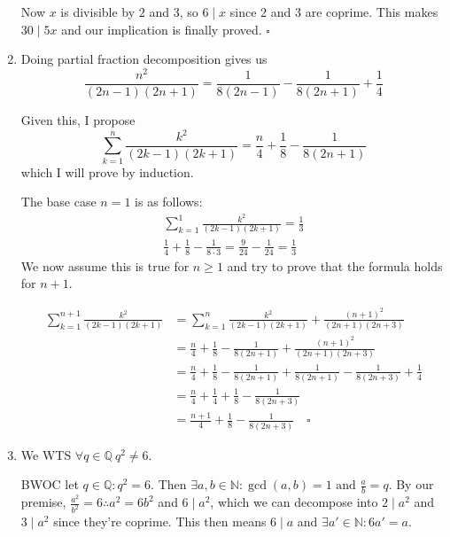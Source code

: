 \documentclass[12pt]{article}
\begin{document}
\begin{enumerate}
            Now $x$ is divisible by $2$ and $3$, so $6 \mid x$ since $2$ and $3$ are coprime.
            This makes $30 \mid 5x$ and our implication is finally proved. $\square$

      \item Doing partial fraction decomposition gives us
            \[\frac{n^2}{(2n-1)(2n+1)}=\frac{1}{8(2n-1)}-\frac{1}{8(2n+1)}+\frac{1}{4}\]

            Given this, I propose
            \[\sum_{k=1}^{n} \frac{k^2}{(2k-1)(2k+1)}=\frac{n}{4}+\frac{1}{8}-\frac{1}{8(2n+1)}\]
            which I will prove by induction.

            The base case $n=1$ is as follows:
            \begin{gather*}
                  \sum_{k=1}^{1} \frac{k^2}{(2k-1)(2k+1)}=\frac{1}{3} \\
                  \frac{1}{4}+\frac{1}{8}-\frac{1}{8 \cdot 3}=\frac{9}{24}-\frac{1}{24}=\frac{1}{3}
            \end{gather*}
            We now assume this is true for $n \ge 1$ and try to prove that the formula holds for $n+1$.

            \begin{align*}
                  \sum_{k=1}^{n+1} \frac{k^2}{(2k-1)(2k+1)}
                   & = \sum_{k=1}^{n} \frac{k^2}{(2k-1)(2k+1)} + \frac{(n+1)^2}{(2n+1)(2n+3)}                      \\
                   & = \frac{n}{4}+\frac{1}{8}-\frac{1}{8(2n+1)} + \frac{(n+1)^2}{(2n+1)(2n+3)}                    \\
                   & = \frac{n}{4}+\frac{1}{8}-\frac{1}{8(2n+1)} + \frac{1}{8(2n+1)}-\frac{1}{8(2n+3)}+\frac{1}{4} \\
                   & = \frac{n}{4}+\frac{1}{4}+\frac{1}{8}-\frac{1}{8(2n+3)}                                       \\
                   & = \frac{n+1}{4}+\frac{1}{8}-\frac{1}{8(2n+3)}\quad\square
            \end{align*}

      \item We WTS $\forall q \in \mathbb{Q}\ q^2 \ne 6$.

            BWOC let $q \in \mathbb{Q}: q^2=6$.
            Then $\exists a, b \in \mathbb{N}: \gcd(a,b)=1 \text{ and } \frac{a}{b}=q$.
            By our premise, $\frac{a^2}{b^2}=6 \therefore a^2=6b^2$ and $6 \mid a^2$,
            which we can decompose into $2 \mid a^2$ and $3 \mid a^2$ since they're coprime.
            This then means $6 \mid a$ and $\exists a' \in \mathbb{N}: 6a'=a$.


\end{enumerate}
\end{document}
